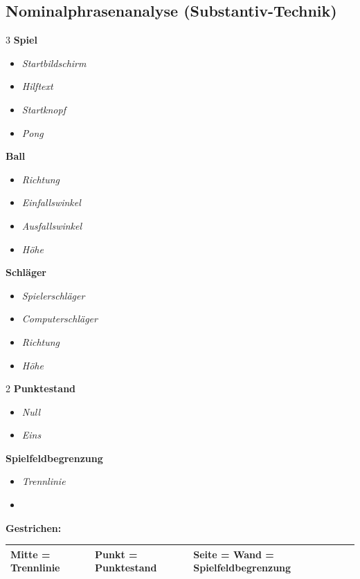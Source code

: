 \documentclass[a4paper,12pt]{article}
\begin{document}
\subsection{Nominalphrasenanalyse (Substantiv-Technik)}
\begin{multicols}{3}
\textbf{Spiel}
\begin{itemize}
    \item[\textendash] \emph{Startbildschirm}
    \item[\textendash] \emph{Hilftext}
    \item[\textendash] \emph{Startknopf}
    \item[\textendash] \emph{Pong}
\end{itemize}
\textbf{Ball}
\begin{itemize}
    \item[\textendash] \emph{Richtung}
    \item[\textendash] \emph{Einfallswinkel}
    \item[\textendash] \emph{Ausfallswinkel}
    \item[\textendash] \emph{Höhe}
\end{itemize}
\textbf{Schläger}
\begin{itemize}
    \item[\textendash] \emph{Spielerschläger}
    \item[\textendash] \emph{Computerschläger}
    \item[\textendash] \emph{Richtung}
    \item[\textendash] \emph{Höhe}
\end{itemize}
\end{multicols}
\begin{multicols}{2}
\textbf{Punktestand}
\begin{itemize}
    \item[\textendash] \emph{Null}
    \item[\textendash] \emph{Eins}
\end{itemize}
\textbf{Spielfeldbegrenzung}
\begin{itemize}
    \item[\textendash] \emph{Trennlinie}
    \item[] 
\end{itemize}
\end{multicols}
\vspace{0.5em}\textbf{Gestrichen:}
\begin{center}
    \begin{tabular}{|l|l|l|l|}
        \hline
        Mitte = Trennlinie & Punkt = Punktestand & Seite = Wand = Spielfeldbegrenzung \\
        \hline
    \end{tabular}
\end{center}
\end{document}
